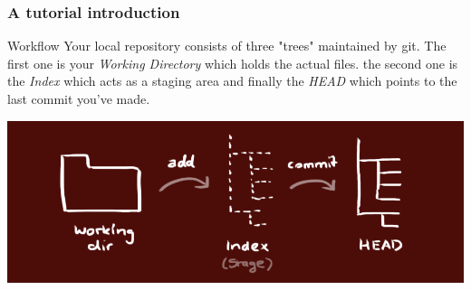 \documentclass[xcolor=dvipsnames]{beamer}
\begin{document}
\begin{frame}
	\frametitle{A tutorial introduction}

	\begin{block}{Workflow}
		Your local repository consists of three "trees" maintained by git. The first one is 
		your \emph{Working Directory} which holds the actual files. the second one is the \emph{Index} which acts as a staging area and finally the \emph{HEAD} which points to the last commit you've made.
	\end{block}
	\begin{center}
		\includegraphics[scale=0.3]{trees.png}
	\end{center}
\end{frame}
\end{document}
